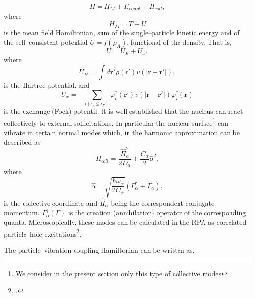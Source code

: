 \begin{equation}\label{eqn:30}
H = H_M + H_{coupl} + H_{coll} ,
\end{equation}
where
\begin{equation}
H_M=T+U
\end{equation}
is the mean field Hamiltonian, sum of the single--particle kinetic energy and of the self--consistent potential $U=f(\rho_A)$, functional of the  density. That is,
\begin{equation}
U=U_H+U_x,
\end{equation}
where
\begin{equation}
U_H=\int d\mathbf r'\rho(r')v(|\mathbf r- \mathbf r'|),
\end{equation}
is the Hartree potential, and
\begin{equation}
U_x=-\sum_{i(\epsilon_i\leq\epsilon_F)}\varphi_i^*(\mathbf r')v(|\mathbf r- \mathbf r'|)\varphi_i^*(\mathbf r)
\end{equation}
is the exchange (Fock) potentil. It is well established that the nucleus can react collectively to external sollicitations. In particular the nuclear surface\footnote{We consider in the present section only this type of collective modes} can vibrate in certain normal modes which, in the harmonic approximation can be described as
 \begin{equation}
H_{coll}=\frac{\hat\Pi_\alpha^2}{2D_\alpha}+\frac{C_\alpha}{2}\hat\alpha^2,
 \end{equation}
 where 
 \begin{equation}
\hat\alpha=\sqrt{\frac{\hbar \omega_\alpha}{2C_\alpha}}\left(\Gamma^\dagger_\alpha+\Gamma_\alpha\right),
 \end{equation}
 is the collective coordinate and $\hat\Pi_\alpha$ being the correspondent conjugate momentum.  $\Gamma^\dagger_\alpha(\Gamma)$ is the creation (annihilation) operator of the corresponding quanta. Microscopically, these modes can be calculated in the RPA as correlated particle--hole excitations\footnote{\cite{Bohm:51,Bohm:52,Bohm:53,Bertsch:05}.}.
 
 
 
The particle--vibration coupling Hamiltonian can be written as,

